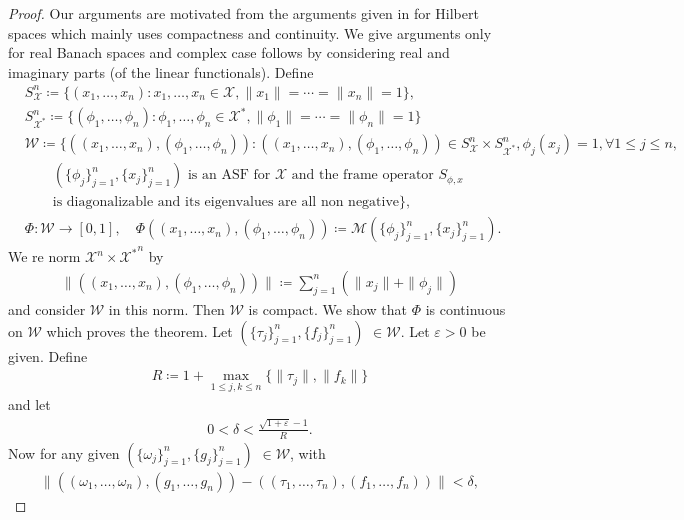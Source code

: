 \documentclass{amsart}
\begin{document}
\begin{proof}
Our arguments are motivated from the arguments given in  \cite{BENEDETTONKOLESAR} for Hilbert spaces which mainly uses compactness and continuity. We give arguments only for real Banach spaces and complex case follows by considering real and imaginary parts (of the linear functionals).	Define
\begin{align*}
	&S_\mathcal{X}^n\coloneqq \{(x_1, \dots, x_n ): x_1, \dots, x_n \in \mathcal{X}, \|x_1\|=\cdots= \|x_n\|=1\},\\
	&S_\mathcal{X^*}^n\coloneqq \{(\phi_1, \dots, \phi_n ): \phi_1, \dots, \phi_n \in \mathcal{X}^*, \|\phi_1\|=\cdots= \|\phi_n\|=1\}\\
	&\mathcal{W} \coloneqq \{((x_1, \dots, x_n ), (\phi_1, \dots, \phi_n )): ((x_1, \dots, x_n ), (\phi_1, \dots ,\phi_n )) \in S_\mathcal{X}^n\times S_\mathcal{X^*}^n, \phi_j(x_j)=1, \forall 1\leq j \leq n,\\
	& \quad \quad  (\{\phi_j \}_{j=1}^n, \{x_j \}_{j=1}^n) \text{ is an ASF for }\mathcal{X}  \text{ and the frame operator }  S_{\phi,x}\\
	&  \quad \quad
	 \text{is diagonalizable and its eigenvalues are all non negative} \},\\
	&\Phi: \mathcal{W} \to [0,1], \quad \Phi((x_1, \dots, x_n ), (\phi_1, \dots, \phi_n ))\coloneqq 	\mathcal{M}(\{\phi_j \}_{j=1}^n, \{x_j \}_{j=1}^n).
\end{align*}
We re norm $\mathcal{X}^n\times \mathcal{X^*}^n$ by 
\begin{align*}
\|((x_1, \dots, x_n ), (\phi_1, \dots, \phi_n ))\|	\coloneqq \sum_{j=1}^{n}(\|x_j\|+\|\phi_j\|)
\end{align*}
and consider $\mathcal{W}$ in this norm.  Then $\mathcal{W}$ is compact. We show that $\Phi$ is continuous on $\mathcal{W}$ which proves the theorem. Let $ (\{\tau_j \}_{j=1}^n, \{f_j \}_{j=1}^n)$ $ \in \mathcal{W}$. Let $\varepsilon>0$ be given. Define 
\begin{align*}
	R\coloneqq 1+ \max_{1\leq j,k \leq n}\{\|\tau_j\|, \|f_k\|\}
\end{align*}
and let 
\begin{align*}
	0<\delta < \frac{\sqrt{1+\varepsilon}-1}{R}.
\end{align*}
Now for any given $ (\{\omega_j \}_{j=1}^n, \{g_j \}_{j=1}^n)$ $ \in \mathcal{W}$,  with 
\begin{align*}
	\|((\omega_1, \dots, \omega_n ), (g_1, \dots, g_n ))-((\tau_1, \dots, \tau_n ), (f_1, \dots, f_n ))\|<\delta,
\end{align*}

\end{proof}
\end{document}
